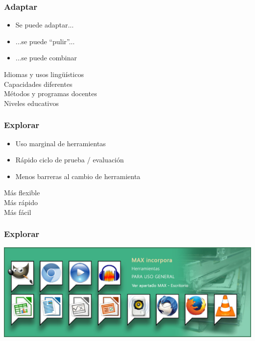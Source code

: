 \documentclass[17pt,aspectratio=169]{beamer}
\begin{document}
\begin{frame}
\frametitle{Adaptar}

\begin{itemize}
\item Se puede adaptar...
\item ...se puede ``pulir''...
\item ...se puede combinar
\end{itemize}

\begin{flushright}
  Idiomas y usos lingüísticos \\
  Capacidades diferentes \\
  Métodos y programas docentes \\
  Niveles educativos \\
\end{flushright}
\end{frame}


\begin{frame}
\frametitle{Explorar}

\begin{itemize}
\item Uso marginal de herramientas
\item Rápido ciclo de prueba / evaluación
\item Menos barreras al cambio de herramienta
\end{itemize}

\begin{flushright}
  Más flexible \\
  Más rápido \\
  Más fácil
\end{flushright}
\end{frame}


\begin{frame}
\frametitle{Explorar}

\includegraphics[width=\linewidth]{figs/max-1}

\end{frame}
\end{document}
